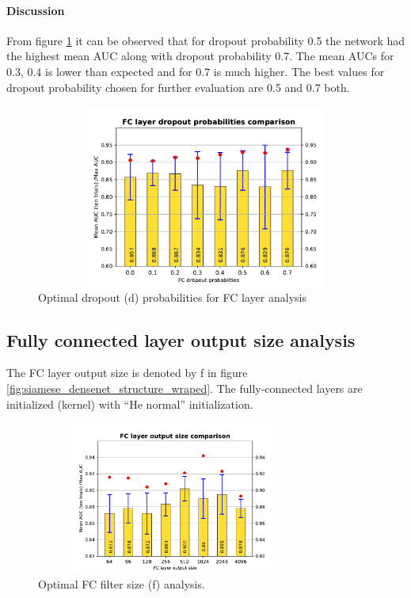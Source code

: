 \paragraph{Discussion\\}
From figure \ref{fig:fc_dropout} it can be observed that for dropout probability 0.5 the network had the highest mean AUC along with dropout probability 0.7. 
The mean AUCs for 0.3, 0.4 is lower than expected and for 0.7 is much higher. The best values for dropout probability chosen for further evaluation are 0.5 and 0.7 both.\\
\begin{figure}[ht]
\centering
\includegraphics[width=12cm,height=6cm]{images/densenet/siamese/densenet_siamese_FC_dropout}
\caption{Optimal dropout (d) probabilities for FC layer analysis}
\label{fig:fc_dropout}
\end{figure}



\subsection{Fully connected layer output size analysis}
The FC layer output size is denoted by f in figure \ref{fig:siamese_densenet_structure_wraped}.
The fully-connected layers are initialized (kernel) with “He normal” initialization.
\begin{figure}[ht]
\centering
\includegraphics[width=9cm,height=5cm]{images/densenet/siamese/densenet_siamese_FC_out}
\caption{Optimal FC filter size (f) analysis.}
\label{fig:fc_filter_size}
\end{figure}

